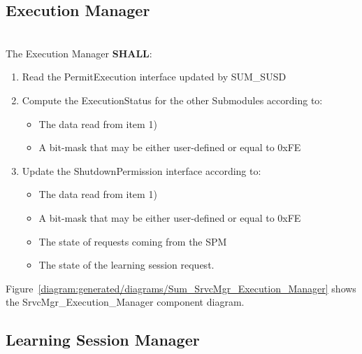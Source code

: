 \subsection{Execution Manager}
\label{subsec:ExecManagerStatic}

\\
The Execution Manager \textbf{SHALL}:

\begin{enumerate}
	\item Read the PermitExecution interface updated by SUM_SUSD
	\item Compute the ExecutionStatus for the other Submodules according to:
	\begin{itemize}
	  \item The data read from item 1)
	  \item A bit-mask that may be either user-defined or equal to 0xFE
	\end{itemize}
	\item Update the ShutdownPermission interface according to:
	\begin{itemize}
	  \item The data read from item 1)
	  \item A bit-mask that may be either user-defined or equal to 0xFE
	  \item The state of requests coming from the SPM
	  \item The state of the learning session request.
	\end{itemize}
\end{enumerate}

{   }

Figure~\ref{diagram:generated/diagrams/Sum_SrvcMgr_Execution_Manager} shows the SrvcMgr_Execution_Manager component diagram. 


\subsection{Learning Session Manager}
\label{subsec:LrngSessionManagerStatic}

